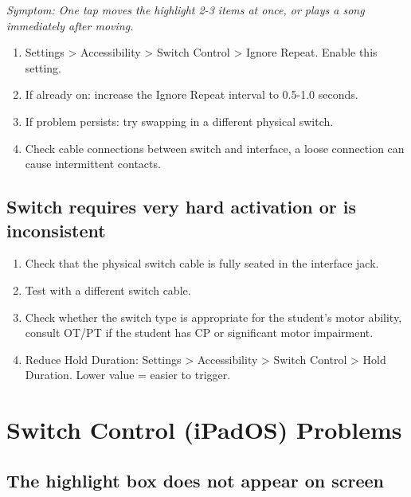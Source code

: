 \documentclass[justified,openright]{tufte-book}
\begin{document}
\emph{Symptom: One tap moves the highlight 2-3 items at once, or plays
a song immediately after moving.}

\begin{enumerate}
\item
  Settings \textgreater{} Accessibility \textgreater{} Switch Control
  \textgreater{} Ignore Repeat. Enable this setting.
\item
  If already on: increase the Ignore Repeat interval to 0.5-1.0
  seconds.
\item
  If problem persists: try swapping in a different physical switch.
\item
  Check cable connections between switch and interface, a loose
  connection can cause intermittent contacts.
\end{enumerate}

\subsection{Switch requires very hard activation or is
inconsistent}\label{switch-requires-very-hard-activation-or-is-inconsistent}

\begin{enumerate}
\item
  Check that the physical switch cable is fully seated in the interface
  jack.
\item
  Test with a different switch cable.
\item
  Check whether the switch type is appropriate for the student's motor
  ability, consult OT/PT if the student has CP or significant motor
  impairment.
\item
  Reduce Hold Duration: Settings \textgreater{} Accessibility
  \textgreater{} Switch Control \textgreater{} Hold Duration. Lower
  value = easier to trigger.
\end{enumerate}

\section{Switch Control (iPadOS)
Problems}\label{switch-control-ipados-problems}

\subsection{The highlight box does not appear on
screen}\label{the-highlight-box-does-not-appear-on-screen}
\end{document}
